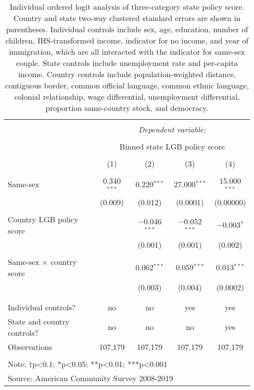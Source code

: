 \documentclass[
  11pt,
]{article}
\begin{document}
\begin{table}[!htbp] \centering 
  \caption{Individual ordered logit analysis of three-category state policy score. Country and state two-way clustered standard errors are shown in parentheses. Individual controls include sex, age, education, number of children, IHS-transformed income, indicator for no income, and year of immigration, which are all interacted with the indicator for same-sex couple. State controls include unemployment rate and per-capita income. Country controls include population-weighted distance, contiguous border, common official language, common ethnic language, colonial relationship, wage differential, unemployment differential, proportion same-country stock, and democracy.} 
  \label{tab:ord} 
\begin{tabular}{@{\extracolsep{5pt}}lcccc} 
\\[-1.8ex]\hline 
\hline \\[-1.8ex] 
 & \multicolumn{4}{c}{\textit{Dependent variable:}} \\ 
\cline{2-5} 
\\[-1.8ex] & \multicolumn{4}{c}{Binned state LGB policy score} \\ 
\\[-1.8ex] & (1) & (2) & (3) & (4)\\ 
\hline \\[-1.8ex] 
 Same-sex & 0.340$^{***}$ & 0.220$^{***}$ & 27.000$^{***}$ & 15.000$^{***}$ \\ 
  & (0.009) & (0.012) & (0.0001) & (0.00000) \\ 
  & & & & \\ 
 Country LGB policy score &  & $-$0.046$^{***}$ & $-$0.052$^{***}$ & $-$0.003$^{*}$ \\ 
  &  & (0.001) & (0.001) & (0.002) \\ 
  & & & & \\ 
 Same-sex × country score &  & 0.062$^{***}$ & 0.059$^{***}$ & 0.013$^{***}$ \\ 
  &  & (0.003) & (0.004) & (0.0002) \\ 
  & & & & \\ 
\hline \\[-1.8ex] 
Individual controls? & no & no & yes & yes \\ 
State and country controls? & no & no & no & yes \\ 
Observations & 107,179 & 107,179 & 107,179 & 107,179 \\ 
\hline 
\hline \\[-1.8ex] 
\multicolumn{5}{l}{Note: †p<0.1; *p<0.05; **p<0.01; ***p<0.001} \\ 
\multicolumn{5}{l}{Source: American Community Survey 2008-2019} \\ 
\end{tabular} 
\end{table}
\end{document}
